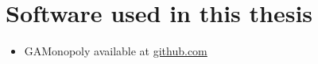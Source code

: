 \clearpage
\newpage
\chapter{Software used in this thesis}
\label{appendix:software}

\begin{itemize}%
  \item{GAMonopoly available at \url{github.com}}
\end{itemize}
